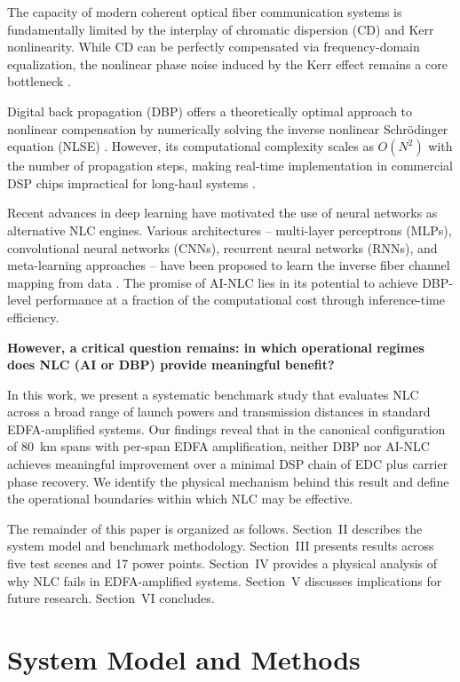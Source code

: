\documentclass[conference]{IEEEtran}
\begin{document}
The capacity of modern coherent optical fiber communication systems is fundamentally limited by the interplay of chromatic dispersion (CD) and Kerr nonlinearity. While CD can be perfectly compensated via frequency-domain equalization, the nonlinear phase noise induced by the Kerr effect remains a core bottleneck \cite{agrawal2013nonlinear}.

Digital back propagation (DBP) offers a theoretically optimal approach to nonlinear compensation by numerically solving the inverse nonlinear Schr\"odinger equation (NLSE) \cite{ip2008compensation}. However, its computational complexity scales as $O(N^2)$ with the number of propagation steps, making real-time implementation in commercial DSP chips impractical for long-haul systems \cite{dar2013interchannel}.

Recent advances in deep learning have motivated the use of neural networks as alternative NLC engines. Various architectures -- multi-layer perceptrons (MLPs), convolutional neural networks (CNNs), recurrent neural networks (RNNs), and meta-learning approaches -- have been proposed to learn the inverse fiber channel mapping from data \cite{feki2021digital,jones2021field}. The promise of AI-NLC lies in its potential to achieve DBP-level performance at a fraction of the computational cost through inference-time efficiency.

\textbf{However, a critical question remains: in which operational regimes does NLC (AI or DBP) provide meaningful benefit?}

In this work, we present a systematic benchmark study that evaluates NLC across a broad range of launch powers and transmission distances in standard EDFA-amplified systems. Our findings reveal that in the canonical configuration of 80~km spans with per-span EDFA amplification, neither DBP nor AI-NLC achieves meaningful improvement over a minimal DSP chain of EDC plus carrier phase recovery. We identify the physical mechanism behind this result and define the operational boundaries within which NLC may be effective.

The remainder of this paper is organized as follows. Section~II describes the system model and benchmark methodology. Section~III presents results across five test scenes and 17 power points. Section~IV provides a physical analysis of why NLC fails in EDFA-amplified systems. Section~V discusses implications for future research. Section~VI concludes.

\section{System Model and Methods}
\end{document}
